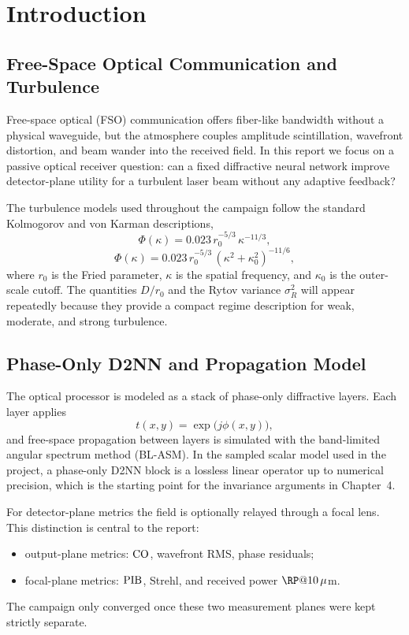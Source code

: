 \chapter{Introduction}

\section{Free-Space Optical Communication and Turbulence}

Free-space optical (FSO) communication offers fiber-like bandwidth without a
physical waveguide, but the atmosphere couples amplitude scintillation,
wavefront distortion, and beam wander into the received field. In this report
we focus on a passive optical receiver question: can a fixed diffractive neural
network improve detector-plane utility for a turbulent laser beam without any
adaptive feedback?

The turbulence models used throughout the campaign follow the standard
Kolmogorov and von Karman descriptions,
\begin{equation}
\Phi(\kappa) = 0.023\, r_0^{-5/3}\, \kappa^{-11/3},
\end{equation}
\begin{equation}
\Phi(\kappa) = 0.023\, r_0^{-5/3}\, (\kappa^2 + \kappa_0^2)^{-11/6},
\end{equation}
where $r_0$ is the Fried parameter, $\kappa$ is the spatial frequency, and
$\kappa_0$ is the outer-scale cutoff. The quantities $D/r_0$ and the Rytov
variance $\sigma_R^2$ will appear repeatedly because they provide a compact
regime description for weak, moderate, and strong turbulence.

\section{Phase-Only D2NN and Propagation Model}

The optical processor is modeled as a stack of phase-only diffractive layers.
Each layer applies
\begin{equation}
t(x,y) = \exp\!\bigl(j \phi(x,y)\bigr),
\end{equation}
and free-space propagation between layers is simulated with the band-limited
angular spectrum method (BL-ASM). In the sampled scalar model used in the
project, a phase-only D2NN block is a lossless linear operator up to numerical
precision, which is the starting point for the invariance arguments in
Chapter~4.

For detector-plane metrics the field is optionally relayed through a focal lens.
This distinction is central to the report:
\begin{itemize}
  \item output-plane metrics: $\mathrm{CO}$, wavefront RMS, phase residuals;
  \item focal-plane metrics: $\mathrm{PIB}$, Strehl, and received power $\RP@10\,\mu$m.
\end{itemize}
The campaign only converged once these two measurement planes were kept
strictly separate.

